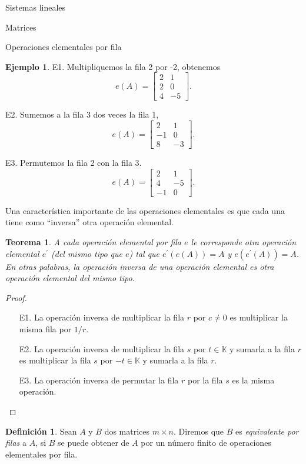 \documentclass[a4paper,12pt,twoside,spanish]{amsbook}
\newtheorem{teorema}{Teorema}[section]
\theoremstyle{definition}
\newtheorem{definicion}{Definici\'on}[section]
\newtheorem{ejemplo}{Ejemplo}[section]
\theoremstyle{remark}
\newcommand{\K}{\mathbb K}
\begin{document}
\begin{chapter}{Sistemas lineales}
\begin{section}{Matrices}
\begin{subsection}{Operaciones elementales por fila}
\begin{ejemplo}
					E1. Multipliquemos la fila 2 por -2, obtenemos
					$$
					e(A) = 
					\begin{bmatrix}
					2&1\\2&0\\4&-5
					\end{bmatrix}.
					$$
					
					E2. Sumemos a la fila 3 dos veces la fila 1,
					$$
					e(A) = 
					\begin{bmatrix}
					2&1\\-1&0\\8&-3
					\end{bmatrix}.
					$$
					
					E3. Permutemos la fila 2 con la fila 3.
					$$
					e(A) = 
					\begin{bmatrix}
					2&1\\4&-5\\-1&0
					\end{bmatrix}.
					$$
				\end{ejemplo}
				
				Una característica importante de las operaciones elementales es que cada una tiene como ``inversa'' otra operación elemental. 
				
				\begin{teorema}\label{op-elem}
					A cada operación elemental por fila $e$ le corresponde otra operación elemental $e^\prime$ (del mismo tipo que $e$) tal que $e^\prime(e(A)) = A$ y $e(e^\prime(A)) = A$. En otras palabras, la operación inversa de una operación elemental es otra operación elemental del mismo tipo.  
				\end{teorema}
				\begin{proof} \
					\begin{enumerate}
						\item[E1.] La operación inversa de multiplicar la fila $r$ por $c\not=0$ es multiplicar la misma fila por $1/r$.
						\item[E2.] La operación inversa de multiplicar la fila $s$ por  $t \in \K$ y sumarla a la fila $r$ es multiplicar  la fila $s$ por  $-t \in \K$ y sumarla a la fila $r$.
						\item[E3.] La operación inversa de permutar la fila $r$ por la fila $s$ es la misma operación.
					\end{enumerate}
				\end{proof}
				
				\begin{definicion} 
					Sean $A$ y $B$ dos matrices $m \times n$. Diremos que $B$ es \textit{equivalente por filas} a $A$, si $B$ se puede obtener de $A$ por un número finito de operaciones elementales por fila. 
				\end{definicion}
				

\end{subsection}
\end{section}
\end{chapter}
\end{document}

